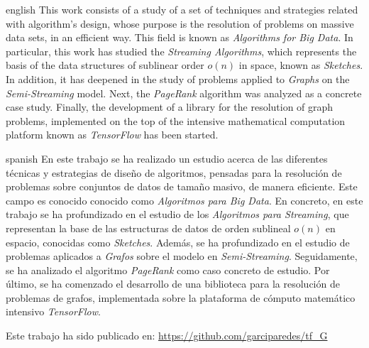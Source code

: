 \documentclass{subfiles}
\newenvironment{abstractpage}
  {\cleardoublepage\vspace*{\fill}\thispagestyle{empty}}
  {\vfill\cleardoublepage}
\newenvironment{abstract-lang}[1]
  {\bigskip\selectlanguage{#1}%
   \begin{center}\bfseries\abstractname\end{center}}
  {\par\bigskip}
\begin{document}
  \begin{abstractpage}
    \begin{abstract-lang}{english}
      This work consists of a study of a set of techniques and strategies related with algorithm's design, whose purpose is the resolution of problems on massive data sets, in an efficient way. This field is known as \emph{Algorithms for Big Data}. In particular, this work has studied the \emph{Streaming Algorithms}, which represents the basis of the data structures of sublinear order $o(n)$ in space, known as \emph{Sketches}. In addition, it has deepened in the study of problems applied to \emph{Graphs} on the \emph{Semi-Streaming} model. Next, the \emph{PageRank} algorithm was analyzed as a concrete case study. Finally, the development of a library for the resolution of graph problems, implemented on the top of the intensive mathematical computation platform known as \emph{TensorFlow} has been started.
    \end{abstract-lang}
    \begin{abstract-lang}{spanish}
      En este trabajo se ha realizado un estudio acerca de las diferentes técnicas y estrategias de diseño de algoritmos, pensadas para la resolución de problemas sobre conjuntos de datos de tamaño masivo, de manera eficiente. Este campo es conocido conocido como \emph{Algoritmos para Big Data}. En concreto, en este trabajo se ha profundizado en el estudio de los \emph{Algoritmos para Streaming}, que representan la base de las estructuras de datos de orden sublineal $o(n)$ en espacio, conocidas como \emph{Sketches}. Además, se ha profundizado en el estudio de problemas aplicados a \emph{Grafos} sobre el modelo en \emph{Semi-Streaming}. Seguidamente, se ha analizado el algoritmo \emph{PageRank} como caso concreto de estudio. Por último, se ha comenzado el desarrollo de una biblioteca para la resolución de problemas de grafos, implementada sobre la plataforma de cómputo matemático intensivo \emph{TensorFlow}.
    \end{abstract-lang}

    \centering
    Este trabajo ha sido publicado en: \url{https://github.com/garciparedes/tf_G}

  \end{abstractpage}
\end{document}
